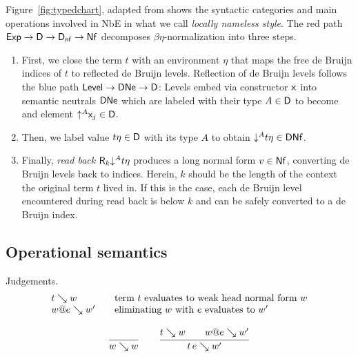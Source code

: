 \documentclass[acmlarge,review,anonymous]{acmart}\settopmatter{printfolios=true}
\begin{document}
Figure~\ref{fig:typedchart}, adapted from \citet{abel:habil} shows the syntactic categories and main operations involved in NbE in what we call \emph{locally nameless style}.  The red path $\mathsf{Exp} \to \mathsf{D} \to \mathsf{D}_{\mathsf{nf}} \to \mathsf{Nf}$ decomposes $\beta\eta$-normalization into three steps.
\begin{enumerate}
\item
First, we close the term $t$ with an environment $\eta$ that maps the free de Bruijn indices of $t$ to reflected de Bruijn levels.  Reflection of de Bruijn levels follows the blue path $\mathsf{Level} \to \mathsf{DNe} \to \mathsf{D}$: Levels embed via constructor $\mathsf{x}_{}$ into semantic neutrals $\mathsf{DNe}$ which are labeled with their type $A \in \mathsf{D}$ to become and element $\mathord{\uparrow^{A}} \mathsf{x}_{j} \in \mathsf{D}$.

\item
Then, we label value $t \eta \in \mathsf{D}$ with its type $A$ to obtain $\mathord{\downarrow^{A}} t \eta \in \mathsf{DNf}$.
\item
Finally, \emph{read back} %
$\mathsf{R}_k \mathord{\downarrow^{A}} t\eta$ produces a long normal form $v \in \mathsf{Nf}$, converting de Bruijn levels back to indices.
Herein, $k$ should be the length of the context the original term $t$ lived in.
If this is the case, each de Bruijn level encountered during read back is below $k$ and can be safely converted to a de Bruijn index.
\end{enumerate}

\subsection{Operational semantics}

Judgements.
\[
\begin{array}{l@{\qquad}l}
  t \evalsto w & \mbox{term $t$ evaluates to weak head normal form $w$} \\
  w @ e \evalsto w' & \mbox{eliminating $w$ with $e$ evaluates to $w'$} \\
\end{array}
\]

\begin{gather*}
  \ru{}{w \evalsto w}
\qquad
  \ru{t \evalsto w \qquad w @ e \evalsto w'}{t\,e \evalsto w'}
\end{gather*}

\end{document}
